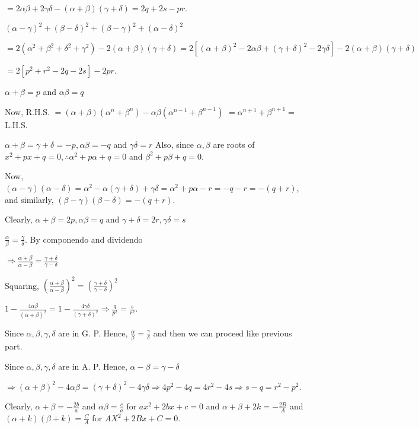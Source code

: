     $= 2\alpha\beta + 2\gamma\delta - (\alpha + \beta)(\gamma + \delta) = 2q + 2s - pr$.
  \item $(\alpha - \gamma)^2 + (\beta - \delta)^2 + (\beta - \gamma)^2 + (\alpha - \delta)^2$

    $= 2(\alpha^2 + \beta^2 + \delta^2 + \gamma^2) - 2(\alpha + \beta)(\gamma + \delta) = 2[(\alpha +
    \beta)^2 - 2\alpha\beta + (\gamma + \delta)^2 - 2\gamma\delta] - 2(\alpha + \beta)(\gamma + \delta)$

    $= 2[p^2 + r^2 - 2q - 2s] - 2pr$.
  \stopitemize
\item $\alpha + \beta = p$ and $\alpha\beta = q$

  Now, R.H.S. $= (\alpha + \beta)(\alpha^n + \beta^n) - \alpha\beta(\alpha^{n - 1} + \beta^{n - 1})$ $=
  \alpha^{n + 1} + \beta^{n + 1} =$ L.H.S.
\item $\alpha + \beta = \gamma + \delta = -p, \alpha\beta = -q$ and $\gamma\delta = r$ Also, since $\alpha,
  \beta$ are roots of $x^2 + px + q = 0, \therefore \alpha^2 + p\alpha + q = 0$ and $\beta^2 + p\beta + q =
  0$.

  Now, $(\alpha - \gamma)(\alpha - \delta) = \alpha^2 - \alpha(\gamma + \delta) + \gamma\delta = \alpha^2 +
  p\alpha - r = -q - r = -(q + r)$, and similarly, $(\beta - \gamma)(\beta - \delta) = -(q + r)$.
\item Clearly, $\alpha + \beta = 2p, \alpha\beta = q$ and $\gamma + \delta = 2r, \gamma\delta = s$
  \startitemize[i]
  \item $\frac{\alpha}{\beta} = \frac{\gamma}{\delta}$. By componendo and dividendo

    $\Rightarrow \frac{\alpha + \beta}{\alpha - \beta} = \frac{\gamma + \delta}{\gamma - \delta}$

    Squaring, $\left(\frac{\alpha + \beta}{\alpha - \beta}\right)^2 = \left(\frac{\gamma + \delta}{\gamma
      - \delta}\right)^2$

    $1 - \frac{4\alpha\beta}{(\alpha + \beta)^2} = 1 - \frac{4\gamma\delta}{(\gamma + \delta)^2}\Rightarrow
    \frac{q}{p^2} = \frac{s}{r^2}$.
  \item Since $\alpha, \beta, \gamma, \delta$ are in G. P. Hence, $\frac{\alpha}{\beta} = \frac{\gamma}{\delta}$ and
    then we can proceed like previous part.
  \item Since $\alpha, \beta, \gamma, \delta$ are in A. P. Hence, $\alpha - \beta = \gamma - \delta$

    $\Rightarrow (\alpha + \beta)^2 - 4\alpha\beta = (\gamma + \delta)^2 - 4\gamma\delta\Rightarrow 4p^2 -
    4q = 4r^2 - 4s \Rightarrow s - q = r^2 - p^2$.
  \stopitemize
\item Clearly, $\alpha + \beta = -\frac{2b}{a}$ and $\alpha\beta = \frac{c}{a}$ for $ax^2 + 2bx + c = 0$ and
  $\alpha + \beta + 2k = -\frac{2B}{A}$ and $(\alpha + k)(\beta + k) = \frac{C}{A}$ for $AX^2 + 2Bx + C = 0$.

